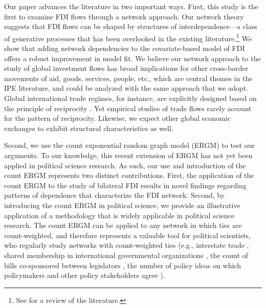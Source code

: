 \documentclass[reqno,onecolumn,letterpaper,12pt]{article}
\begin{document}
Our paper advances the literature in two important ways. First, this study is the first to examine FDI flows through a network approach. Our network theory suggests that FDI flows can be shaped by structures of interdependence---a class of generative processes that has been overlooked in the existing literature.\footnote{See \citet{Pandya:2016} for a review of the literature.} We show that adding network dependencies to the covariate-based model of FDI offers a robust improvement in model fit. %
We believe our network approach to the study of global investment flows has broad implications for other cross-border movements of aid, goods, services, people, etc., which are central themes in the IPE literature, and could be analyzed with the same approach that we adopt. Global international trade regimes, for instance, are explicitly designed based on the principle of reciprocity \citep{Bagwell_Staiger:1999}. Yet empirical studies of trade flows rarely account for the pattern of reciprocity. Likewise, we expect other global economic exchanges to exhibit structural characteristics as well.

Second, we use the count exponential random graph model (ERGM) \citep{krivitsky2012exponential} to test our arguments. To our knowledge, this recent extension of ERGM has not yet been applied in political science research. As such, our use and introduction of the count ERGM represents two distinct contributions. First, the application of the count ERGM to the study of bilateral FDI results in novel findings regarding patterns of dependence that characterize the FDI network. Second, by introducing the count ERGM in political science, we provide an illustrative application of a methodology that is widely applicable in political science research. The count ERGM can be applied to any network in which ties are count-weighted, and therefore represents a valuable tool for political scientists, who regularly study networks with count-weighted ties (e.g., interstate trade \citep{ward2007persistent}, shared membership in international governmental organizations \citep{boehmke2016addressing}, the count of bills co-sponsored between legislators \citep{kirkland2013hypothesis}, the number of policy ideas on which policymakers and other policy stakeholders agree \citep{leifeld2013reconceptualizing}).
\end{document}
